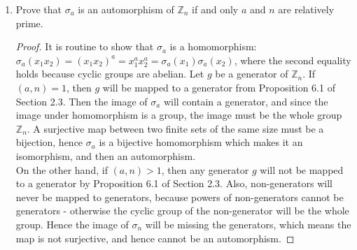 \documentclass{article}
\begin{document}
\begin{enumerate}
\begin{enumerate}
        \begin{enumerate}
          \item Prove that $\sigma_a$ is an automorphism of $\mathbb{Z}_n$
            if and only $a$ and $n$ are relatively prime.
            \begin{proof}
              It is routine to show that $\sigma_a$ is a homomorphism:
              $\sigma_a(x_1x_2)=(x_1x_2)^a=x_1^ax_2^a=\sigma_a(x_1)\sigma_a(x_2)$,
              where the second equality holds because cyclic groups are
              abelian. Let $g$ be a generator of $\mathbb{Z}_n$. If
              $(a,n)=1$, then $g$ will be mapped to a generator from
              Proposition 6.1 of Section 2.3. Then the image of $\sigma_a$
              will contain a generator, and since the image under
              homomorphism is a group, the image must be the whole group
              $\mathbb{Z}_n$. A surjective map between two finite sets of the
              same size must be a bijection, hence $\sigma_a$ is a
              bijective homomorphism which makes it an isomorphism, and
              then an automorphism. \\

              On the other hand, if $(a,n)>1$, then any generator $g$ will
              not be mapped to a generator by Proposition 6.1 of Section
              2.3. Also, non-generators will never be mapped to generators,
              because powers of non-generators cannot be generators -
              otherwise the cyclic group of the non-generator will be the
              whole group. Hence the image of $\sigma_n$ will be missing
              the generators, which means the map is not surjective, and
              hence cannot be an automorphism.
            \end{proof}


\end{enumerate}
\end{enumerate}
\end{enumerate}
\end{document}
